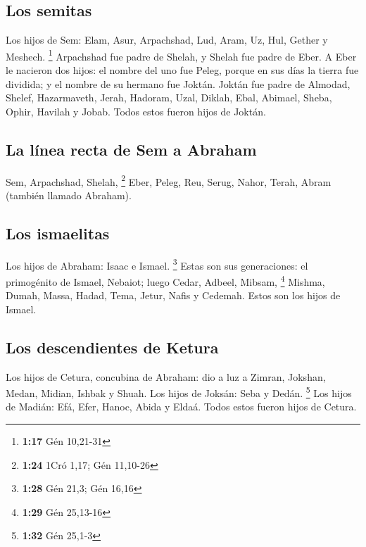 \hypertarget{los-semitas}{%
\subsection{Los semitas}\label{los-semitas}}

 Los hijos de Sem: Elam, Asur, Arpachshad, Lud, Aram, Uz,
Hul, Gether y Meshech. \footnote{\textbf{1:17} Gén 10,21-31}
 Arpachshad fue padre de Shelah, y Shelah fue padre de
Eber.  A Eber le nacieron dos hijos: el nombre del uno
fue Peleg, porque en sus días la tierra fue dividida; y el nombre de su
hermano fue Joktán.  Joktán fue padre de Almodad, Shelef,
Hazarmaveth, Jerah,  Hadoram, Uzal, Diklah,
 Ebal, Abimael, Sheba,  Ophir, Havilah y
Jobab. Todos estos fueron hijos de Joktán.

\hypertarget{la-luxednea-recta-de-sem-a-abraham}{%
\subsection{La línea recta de Sem a
Abraham}\label{la-luxednea-recta-de-sem-a-abraham}}

 Sem, Arpachshad, Shelah, \footnote{\textbf{1:24} 1Cró
  1,17; Gén 11,10-26}  Eber, Peleg, Reu, 
Serug, Nahor, Terah,  Abram (también llamado Abraham).

\hypertarget{los-ismaelitas}{%
\subsection{Los ismaelitas}\label{los-ismaelitas}}

 Los hijos de Abraham: Isaac e Ismael. \footnote{\textbf{1:28}
  Gén 21,3; Gén 16,16}  Estas son sus generaciones: el
primogénito de Ismael, Nebaiot; luego Cedar, Adbeel, Mibsam, \footnote{\textbf{1:29}
  Gén 25,13-16}  Mishma, Dumah, Massa, Hadad, Tema,
 Jetur, Nafis y Cedemah. Estos son los hijos de Ismael.

\hypertarget{los-descendientes-de-ketura}{%
\subsection{Los descendientes de
Ketura}\label{los-descendientes-de-ketura}}

 Los hijos de Cetura, concubina de Abraham: dio a luz a
Zimran, Jokshan, Medan, Midian, Ishbak y Shuah. Los hijos de Joksán:
Seba y Dedán. \footnote{\textbf{1:32} Gén 25,1-3}  Los
hijos de Madián: Efá, Efer, Hanoc, Abida y Eldaá. Todos estos fueron
hijos de Cetura.


